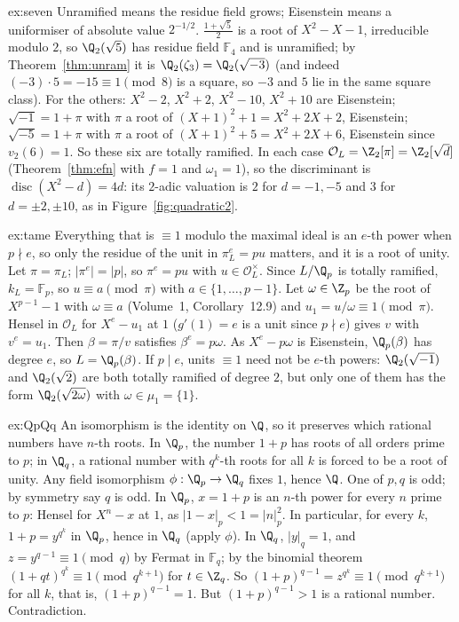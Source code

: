 \begin{solution}{ex:seven}
\idea Unramified means the residue field grows; Eisenstein means a uniformiser of absolute value $2^{-1/2}$.
\writeup $\frac{1+\sqrt5}2$ is a root of $X^2-X-1$, irreducible modulo $2$, so $\Q_2(\sqrt5)$ has residue field $\mathbb F_4$ and is
unramified; by Theorem~\ref{thm:unram} it is $\Q_2(\zeta_3)=\Q_2(\sqrt{-3})$ (and indeed $(-3)\cdot5=-15\equiv1\pmod8$ is a square, so
$-3$ and $5$ lie in the same square class).
For the others: $X^2-2$, $X^2+2$, $X^2-10$, $X^2+10$ are Eisenstein; $\sqrt{-1}=1+\pi$ with $\pi$ a root of $(X+1)^2+1=X^2+2X+2$,
Eisenstein; $\sqrt{-5}=1+\pi$ with $\pi$ a root of $(X+1)^2+5=X^2+2X+6$, Eisenstein since $v_2(6)=1$. So these six are totally
ramified. In each case $\mathcal O_L=\Z_2[\pi]=\Z_2[\sqrt d]$ (Theorem~\ref{thm:efn} with $f=1$ and $\omega_1=1$), so the
discriminant is $\operatorname{disc}(X^2-d)=4d$: its $2$-adic valuation is $2$ for $d=-1,-5$ and $3$ for $d=\pm2,\pm10$, as in
Figure~\ref{fig:quadratic2}.
\end{solution}

\begin{solution}{ex:tame}
\idea Everything that is $\equiv1$ modulo the maximal ideal is an $e$-th power when $p\nmid e$, so only the residue of the unit
in $\pi_L^e=pu$ matters, and it is a root of unity.
\writeup Let $\pi=\pi_L$; $|\pi^e|=|p|$, so $\pi^e=pu$ with $u\in\mathcal O_L^\times$. Since $L/\Q_p$ is totally ramified, $k_L=\mathbb F_p$,
so $u\equiv a\pmod\pi$ with $a\in\{1,\dots,p-1\}$. Let $\omega\in\Z_p$ be the root of $X^{p-1}-1$ with $\omega\equiv a$ (Volume~1,
Corollary~12.9) and $u_1=u/\omega\equiv1\pmod\pi$. Hensel in $\mathcal O_L$ for $X^e-u_1$ at $1$ ($g'(1)=e$ is a unit since $p\nmid e$)
gives $v$ with $v^e=u_1$. Then $\beta=\pi/v$ satisfies $\beta^e=p\omega$. As $X^e-p\omega$ is Eisenstein, $\Q_p(\beta)$ has degree $e$,
so $L=\Q_p(\beta)$. If $p\mid e$, units $\equiv1$ need not be $e$-th powers: $\Q_2(\sqrt{-1})$ and $\Q_2(\sqrt2)$ are both totally
ramified of degree $2$, but only one of them has the form $\Q_2(\sqrt{2\omega})$ with $\omega\in\mu_1=\{1\}$.
\end{solution}

\begin{solution}{ex:QpQq}
\idea An isomorphism is the identity on $\Q$, so it preserves which rational numbers have $n$-th roots. In $\Q_p$, the number
$1+p$ has roots of all orders prime to $p$; in $\Q_q$, a rational number with $q^k$-th roots for all $k$ is forced to be a root
of unity.
\writeup Any field isomorphism $\phi:\Q_p\to\Q_q$ fixes $1$, hence $\Q$. One of $p,q$ is odd; by symmetry say $q$ is odd. In $\Q_p$,
$x=1+p$ is an $n$-th power for every $n$ prime to $p$: Hensel for $X^n-x$ at $1$, as $|1-x|_p<1=|n|_p^2$. In particular, for every
$k$, $1+p=y^{q^k}$ in $\Q_p$, hence in $\Q_q$ (apply $\phi$). In $\Q_q$, $|y|_q=1$, and $z=y^{q-1}\equiv1\pmod q$ by Fermat in
$\mathbb F_q$; by the binomial theorem $(1+qt)^{q^k}\equiv1\pmod{q^{k+1}}$ for $t\in\Z_q$. So $(1+p)^{q-1}=z^{q^k}\equiv1\pmod
{q^{k+1}}$ for all $k$, that is, $(1+p)^{q-1}=1$. But $(1+p)^{q-1}>1$ is a rational number. Contradiction.
\end{solution}

